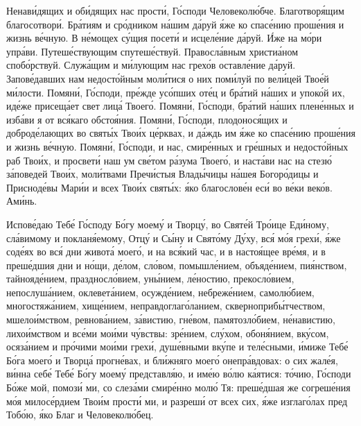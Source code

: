 \begin{mymulticols}
Ненав\'{и}дящих и об\'{и}дящих нас прост\'{и}, Г\'{о}споди Человекол\'{ю}бче. Благотвор\'{я}щим благосотвор\'{и}. Бр\'{а}тиям и ср\'{о}дником н\'{а}шим д\'{а}руй \'{я}же ко спас\'{е}нию прош\'{е}ния и жизнь в\'{е}чную. В н\'{е}мощех с\'{у}щия посет\'{и} и исцел\'{е}ние д\'{а}руй. \'{И}же на м\'{о}ри упр\'{а}ви. Путеш\'{е}ствующим спутеш\'{е}ствуй. Правосл\'{а}вным христи\'{а}ном споб\'{о}рствуй. Служ\'{а}щим и м\'{и}лующим нас грех\'{о}в оставл\'{е}ние д\'{а}руй. Запов\'{е}давших нам недост\'{о}йным мол\'{и}тися о них пом\'{и}луй по вел\'{и}цей Тво\'{е}й м\'{и}лости. Помян\'{и}, Г\'{о}споди, пр\'{е}жде ус\'{о}пших от\'{е}ц и бр\'{а}тий н\'{а}ших и упок\'{о}й их, ид\'{е}же присещ\'{а}ет свет лиц\'{а} Твоег\'{о}. Помян\'{и}, Г\'{о}споди, бр\'{а}тий н\'{а}ших плен\'{е}нных и изб\'{а}ви я от вс\'{я}каго обсто\'{я}ния. Помян\'{и}, Г\'{о}споди, плодонос\'{я}щих и доброд\'{е}лающих во свят\'{ы}х Тво\'{и}х ц\'{е}рквах, и д\'{а}ждь им \'{я}же ко спас\'{е}нию прош\'{е}ния и жизнь в\'{е}чную. Помян\'{и}, Г\'{о}споди, и нас, смир\'{е}нных и гр\'{е}шных и недост\'{о}йных раб Тво\'{и}х, и просвет\'{и} наш ум св\'{е}том р\'{а}зума Твоег\'{о}, и наст\'{а}ви нас на стез\'{ю} з\'{а}поведей Тво\'{и}х, мол\'{и}твами Преч\'{и}стыя Влад\'{ы}чицы н\'{а}шея Богор\'{о}дицы и Приснод\'{е}вы Мар\'{и}и и всех Тво\'{и}х свят\'{ы}х: \'{я}ко благослов\'{е}н ес\'{и} во в\'{е}ки век\'{о}в. Ам\'{и}нь.


Испов\'{е}даю Теб\'{е} Г\'{о}споду Б\'{о}гу моем\'{у} и Творц\'{у}, во Свят\'{е}й Тр\'{о}ице Ед\'{и}ному, сл\'{а}вимому и поклан\'{я}емому, Отц\'{у} и С\'{ы}ну и Свят\'{о}му Д\'{у}ху, вс\'{я} м\'{о}я грех\'{и}, \'{я}же сод\'{е}ях во вс\'{я} дни живот\'{а} моег\'{о}, и на вс\'{я}кий час, и в насто\'{я}щее вр\'{е}мя, и в преш\'{е}дшия дни и н\'{о}щи, д\'{е}лом, сл\'{о}вом, помышл\'{е}нием, объяд\'{е}нием, пи\'{я}нством, тайнояд\'{е}нием, праздносл\'{о}вием, ун\'{ы}нием, л\'{е}ностию, прекосл\'{о}вием, непослуш\'{а}нием, оклевет\'{а}нием, осужд\'{е}нием, небреж\'{е}нием, самол\'{ю}бием, многостяж\'{а}нием, хищ\'{е}нием, неправдоглаг\'{о}ланием, скверноприб\'{ы}тчеством, мшело\'{и}мством, ревнов\'{а}нием, з\'{а}вистию, гн\'{е}вом, памятозл\'{о}бием, н\'{е}навистию, лихо\'{и}мством и вс\'{е}ми мо\'{и}ми ч\'{у}вствы: зр\'{е}нием, сл\'{у}хом, обон\'{я}нием, вк\'{у}сом, осяз\'{а}нием и пр\'{о}чими мо\'{и}ми грех\'{и}, душ\'{е}вными вк\'{у}пе и тел\'{е}сными, \'{и}миже Теб\'{е} Б\'{о}га моег\'{о} и Творц\'{а} прогн\'{е}вах, и бл\'{и}жняго моег\'{о} онепр\'{а}вдовах: о сих жал\'{е}я, в\'{и}нна себ\'{е} Теб\'{е} Б\'{о}гу моем\'{у} представл\'{я}ю, и им\'{е}ю в\'{о}лю к\'{а}ятися: т\'{о}чию, Г\'{о}споди Б\'{о}же мой, помоз\'{и} ми, со слез\'{а}ми смир\'{е}нно мол\'{ю} Тя: преш\'{е}дшая же согреш\'{е}ния м\'{о}я милос\'{е}рдием Тво\'{и}м прост\'{и} ми, и разреш\'{и} от всех сих, \'{я}же изглаг\'{о}лах пред Тоб\'{о}ю, \'{я}ко Благ и Человекол\'{ю}бец.


\end{mymulticols}
